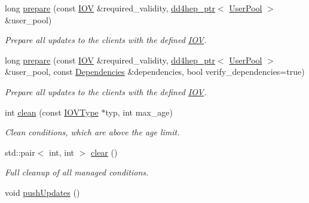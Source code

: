 \begin{DoxyCompactItemize}
long \hyperlink{class_d_d4hep_1_1_conditions_1_1_conditions_manager_object_a4550e641d43365715516abc3f82586e6}{prepare} (const \hyperlink{class_d_d4hep_1_1_i_o_v}{IOV} \&required\_\-validity, \hyperlink{class_d_d4hep_1_1dd4hep__ptr}{dd4hep\_\-ptr}$<$ \hyperlink{class_d_d4hep_1_1_conditions_1_1_user_pool}{UserPool} $>$ \&user\_\-pool)
\begin{DoxyCompactList}\small\item\em Prepare all updates to the clients with the defined \hyperlink{class_d_d4hep_1_1_i_o_v}{IOV}. \item\end{DoxyCompactList}\item 
long \hyperlink{class_d_d4hep_1_1_conditions_1_1_conditions_manager_object_a12104037c413426d82374b639acd88e8}{prepare} (const \hyperlink{class_d_d4hep_1_1_i_o_v}{IOV} \&required\_\-validity, \hyperlink{class_d_d4hep_1_1dd4hep__ptr}{dd4hep\_\-ptr}$<$ \hyperlink{class_d_d4hep_1_1_conditions_1_1_user_pool}{UserPool} $>$ \&user\_\-pool, const \hyperlink{class_d_d4hep_1_1_conditions_1_1_conditions_dependency_collection}{Dependencies} \&dependencies, bool verify\_\-dependencies=true)
\begin{DoxyCompactList}\small\item\em Prepare all updates to the clients with the defined \hyperlink{class_d_d4hep_1_1_i_o_v}{IOV}. \item\end{DoxyCompactList}\item 
int \hyperlink{class_d_d4hep_1_1_conditions_1_1_conditions_manager_object_aca6c43594d93ab8773e245b8cffb0f60}{clean} (const \hyperlink{class_d_d4hep_1_1_i_o_v_type}{IOVType} $\ast$typ, int max\_\-age)
\begin{DoxyCompactList}\small\item\em Clean conditions, which are above the age limit. \item\end{DoxyCompactList}\item 
std::pair$<$ int, int $>$ \hyperlink{class_d_d4hep_1_1_conditions_1_1_conditions_manager_object_a16cf2685ed249700904621d9a68bcdb2}{clear} ()
\begin{DoxyCompactList}\small\item\em Full cleanup of all managed conditions. \item\end{DoxyCompactList}\item 
void \hyperlink{class_d_d4hep_1_1_conditions_1_1_conditions_manager_object_a9bda89e54e1ad3b202f7295ec6c102a8}{pushUpdates} ()

\end{DoxyCompactItemize}
